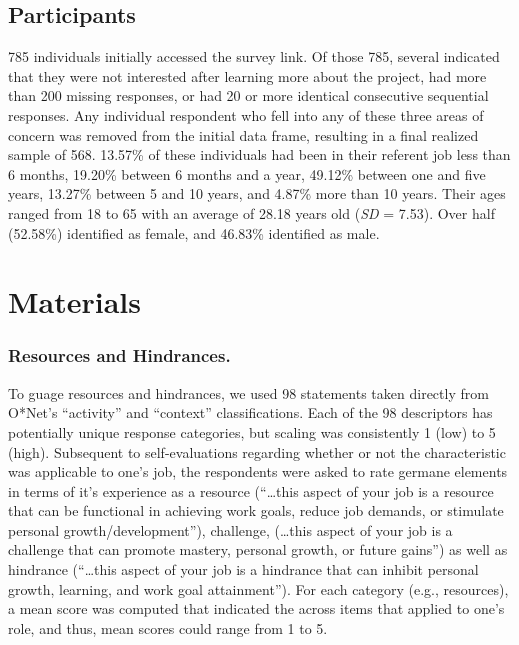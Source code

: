 \documentclass[
  man]{apa6}
\begin{document}
\hypertarget{participants}{%
\subsection{Participants}\label{participants}}

785 individuals initially accessed the survey link. Of those 785, several indicated that they were not interested after learning more about the project, had more than 200 missing responses, or had 20 or more identical consecutive sequential responses. Any individual respondent who fell into any of these three areas of concern was removed from the initial data frame, resulting in a final realized sample of 568. 13.57\% of these individuals had been in their referent job less than 6 months, 19.20\% between 6 months and a year, 49.12\% between one and five years, 13.27\% between 5 and 10 years, and 4.87\% more than 10 years. Their ages ranged from 18 to 65 with an average of 28.18 years old (\emph{SD} = 7.53). Over half (52.58\%) identified as female, and 46.83\% identified as male.

\hypertarget{materials}{%
\section{Materials}\label{materials}}

\hypertarget{resources-and-hindrances.}{%
\subsubsection{Resources and Hindrances.}\label{resources-and-hindrances.}}

To guage resources and hindrances, we used 98 statements taken directly from O*Net's ``activity'' and ``context'' classifications. Each of the 98 descriptors has potentially unique response categories, but scaling was consistently 1 (low) to 5 (high). Subsequent to self-evaluations regarding whether or not the characteristic was applicable to one's job, the respondents were asked to rate germane elements in terms of it's experience as a resource (``\ldots this aspect of your job is a resource that can be functional in achieving work goals, reduce job demands, or stimulate personal growth/development''), challenge, (\ldots this aspect of your job is a challenge that can promote mastery, personal growth, or future gains'') as well as hindrance (``\ldots this aspect of your job is a hindrance that can inhibit personal growth, learning, and work goal attainment''). For each category (e.g., resources), a mean score was computed that indicated the across items that applied to one's role, and thus, mean scores could range from 1 to 5.
\end{document}
